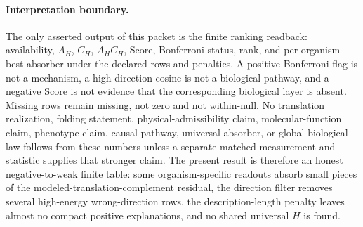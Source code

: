 \paragraph{Interpretation boundary.}
The only asserted output of this packet is the finite ranking readback: availability, $A_H$, $C_H$, $A_HC_H$, Score, Bonferroni status, rank, and per-organism best absorber under the declared rows and penalties.  A positive Bonferroni flag is not a mechanism, a high direction cosine is not a biological pathway, and a negative Score is not evidence that the corresponding biological layer is absent.  Missing rows remain missing, not zero and not within-null.  No translation realization, folding statement, physical-admissibility claim, molecular-function claim, phenotype claim, causal pathway, universal absorber, or global biological law follows from these numbers unless a separate matched measurement and statistic supplies that stronger claim.  The present result is therefore an honest negative-to-weak finite table: some organism-specific readouts absorb small pieces of the modeled-translation-complement residual, the direction filter removes several high-energy wrong-direction rows, the description-length penalty leaves almost no compact positive explanations, and no shared universal $H$ is found.

